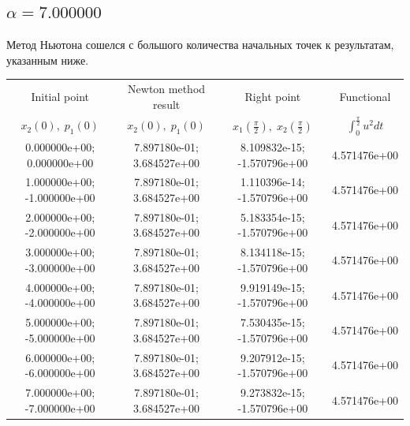 \documentclass[titlepage]{article}
\def\l{\left}
\def\r{\right}
\begin{document}
\subsection{$\alpha = 7.000000$} 
Метод Ньютона сошелся с большого количества начальных точек к результатам, указанным ниже. \\ 
\begin{tabular}{ | c | c | c | c |} 
\hline 
Initial point  & Newton method result & Right point & Functional 
 \\ $x_2(0), \; p_1(0)$ & $x_2(0), \; p_1(0)$ & $x_1\l(\frac{\pi}{2}\r), \; x_2\l(\frac{\pi}{2}\r)$ & $\int_{0}^{\frac{\pi}{2}}u^2dt$  \\ \hline 
0.000000e+00; 0.000000e+00 & 7.897180e-01; 3.684527e+00 & 8.109832e-15; -1.570796e+00 & 4.571476e+00 \\ \hline 
1.000000e+00; -1.000000e+00 & 7.897180e-01; 3.684527e+00 & 1.110396e-14; -1.570796e+00 & 4.571476e+00 \\ \hline 
2.000000e+00; -2.000000e+00 & 7.897180e-01; 3.684527e+00 & 5.183354e-15; -1.570796e+00 & 4.571476e+00 \\ \hline 
3.000000e+00; -3.000000e+00 & 7.897180e-01; 3.684527e+00 & 8.134118e-15; -1.570796e+00 & 4.571476e+00 \\ \hline 
4.000000e+00; -4.000000e+00 & 7.897180e-01; 3.684527e+00 & 9.919149e-15; -1.570796e+00 & 4.571476e+00 \\ \hline 
5.000000e+00; -5.000000e+00 & 7.897180e-01; 3.684527e+00 & 7.530435e-15; -1.570796e+00 & 4.571476e+00 \\ \hline 
6.000000e+00; -6.000000e+00 & 7.897180e-01; 3.684527e+00 & 9.207912e-15; -1.570796e+00 & 4.571476e+00 \\ \hline 
7.000000e+00; -7.000000e+00 & 7.897180e-01; 3.684527e+00 & 9.273832e-15; -1.570796e+00 & 4.571476e+00 \\ \hline 
\end{tabular} 
\end{document}
